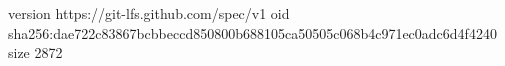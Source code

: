 version https://git-lfs.github.com/spec/v1
oid sha256:dae722c83867bcbbeccd850800b688105ca50505c068b4c971ec0adc6d4f4240
size 2872
